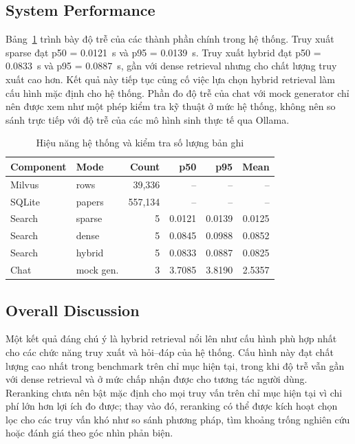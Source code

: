 \documentclass[conference]{IEEEtran}
\begin{document}
\subsection{System Performance}

Bảng~\ref{tab:system-performance} trình bày độ trễ của các thành phần chính trong hệ thống. Truy xuất sparse đạt p50 = 0.0121~s và p95 = 0.0139~s. Truy xuất hybrid đạt p50 = 0.0833~s và p95 = 0.0887~s, gần với dense retrieval nhưng cho chất lượng truy xuất cao hơn. Kết quả này tiếp tục củng cố việc lựa chọn hybrid retrieval làm cấu hình mặc định cho hệ thống. Phần đo độ trễ của chat với mock generator chỉ nên được xem như một phép kiểm tra kỹ thuật ở mức hệ thống, không nên so sánh trực tiếp với độ trễ của các mô hình sinh thực tế qua Ollama.

\begin{table}[t]
\caption{Hiệu năng hệ thống và kiểm tra số lượng bản ghi}
\label{tab:system-performance}
\centering
\footnotesize
\setlength{\tabcolsep}{3pt}
\begin{tabular*}{\columnwidth}{@{\extracolsep{\fill}}llrrrr@{}}
\toprule
\textbf{Component} & \textbf{Mode} & \textbf{Count} & \textbf{p50} & \textbf{p95} & \textbf{Mean}\\
\midrule
Milvus & rows & 39,336 & -- & -- & --\\
SQLite & papers & 557,134 & -- & -- & --\\
Search & sparse & 5 & 0.0121 & 0.0139 & 0.0125\\
Search & dense & 5 & 0.0845 & 0.0988 & 0.0852\\
Search & hybrid & 5 & 0.0833 & 0.0887 & 0.0825\\
Chat & mock gen. & 3 & 3.7085 & 3.8190 & 2.5357\\
\bottomrule
\end{tabular*}
\end{table}

\subsection{Overall Discussion}

Một kết quả đáng chú ý là hybrid retrieval nổi lên như cấu hình phù hợp nhất cho các chức năng truy xuất và hỏi--đáp của hệ thống. Cấu hình này đạt chất lượng cao nhất trong benchmark trên chỉ mục hiện tại, trong khi độ trễ vẫn gần với dense retrieval và ở mức chấp nhận được cho tương tác người dùng. Reranking chưa nên bật mặc định cho mọi truy vấn trên chỉ mục hiện tại vì chi phí lớn hơn lợi ích đo được; thay vào đó, reranking có thể được kích hoạt chọn lọc cho các truy vấn khó như so sánh phương pháp, tìm khoảng trống nghiên cứu hoặc đánh giá theo góc nhìn phản biện.
\end{document}
